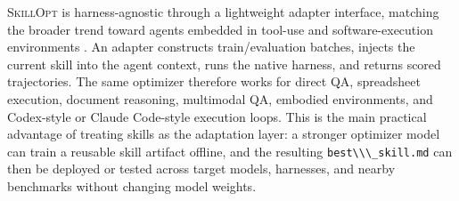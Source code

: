 \documentclass[
]{article}
\newcommand{\passthrough}[1]{#1}
\newcommand{\ourmethod}{\textsc{SkillOpt}\xspace}
\begin{document}
\ourmethod{} is harness-agnostic through a lightweight adapter
interface, matching the broader trend toward agents embedded in tool-use
and software-execution environments
\citep{yao2022react, schick2023toolformer, yang2024sweagent}. An adapter
constructs train/evaluation batches, injects the current skill into the
agent context, runs the native harness, and returns scored trajectories.
The same optimizer therefore works for direct QA, spreadsheet execution,
document reasoning, multimodal QA, embodied environments, and
Codex-style or Claude Code-style execution loops. This is the main
practical advantage of treating skills as the adaptation layer: a
stronger optimizer model can train a reusable skill artifact offline,
and the resulting \passthrough{\lstinline!best\\\_skill.md!} can then be
deployed or tested across target models, harnesses, and nearby
benchmarks without changing model weights.
\end{document}
